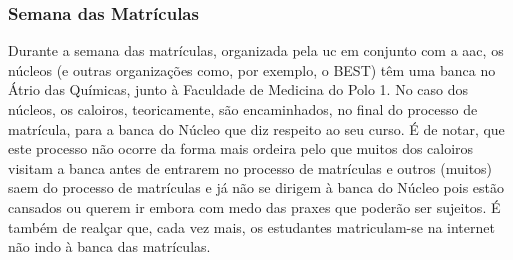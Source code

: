 
\subsubsection{Semana das Matrículas}

Durante a semana das matrículas, organizada pela \acrshort{uc} em conjunto com a \acrshort{aac}, os núcleos (e outras organizações como, por exemplo, o BEST) têm uma banca no Átrio das Químicas, junto à Faculdade de Medicina do Polo 1. No caso dos núcleos, os caloiros, teoricamente, são encaminhados, no final do processo de matrícula, para a banca do Núcleo que diz respeito ao seu curso. É de notar, que este processo não ocorre da forma mais ordeira pelo que muitos dos caloiros visitam a banca antes de entrarem no processo de matrículas e outros (muitos) saem do processo de matrículas e já não se dirigem à banca do Núcleo pois estão cansados ou querem ir embora com medo das praxes que poderão ser sujeitos. É também de realçar que, cada vez mais, os estudantes matriculam-se na internet não indo à banca das matrículas.

